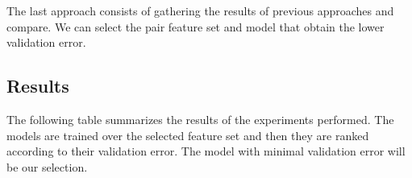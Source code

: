 The last approach consists of gathering the results of previous approaches and compare. We can select the pair feature set and model that obtain the lower validation error.




\subsection{Results}

The following table summarizes the results of the experiments performed. The models are trained over the selected feature set and then they are ranked according to their validation error. The model with minimal validation error will be our selection. 

%

